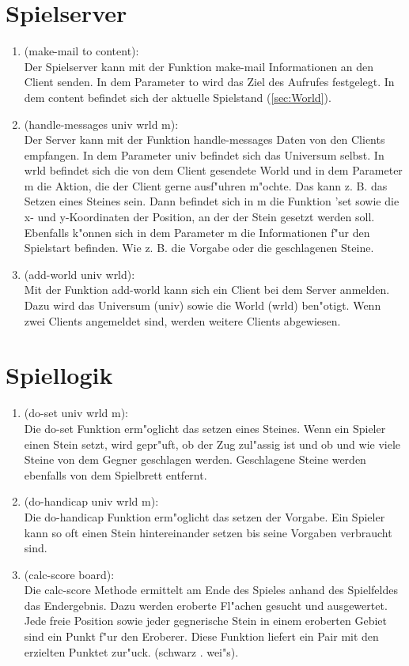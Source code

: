 \documentclass[a4paper]{scrreprt}
\begin{document}
\section{Spielserver}
\begin{enumerate}
\item (make-mail to content):\\
Der Spielserver kann mit der Funktion make-mail Informationen an den Client senden. In dem Parameter to wird das Ziel des Aufrufes festgelegt. In dem content befindet sich der aktuelle Spielstand (\ref{sec:World}).

\item (handle-messages univ wrld m):\\
Der Server kann mit der Funktion handle-messages Daten von den Clients empfangen. In dem Parameter univ befindet sich das Universum selbst. In wrld befindet sich die von dem Client gesendete World und in dem Parameter m die Aktion, die der Client gerne ausf"uhren m"ochte. Das kann z. B. das Setzen eines Steines sein. Dann befindet sich in m die Funktion 'set sowie die x- und y-Koordinaten der Position, an der der Stein gesetzt werden soll. Ebenfalls k"onnen sich in dem Parameter m die Informationen f"ur den Spielstart befinden. Wie z. B. die Vorgabe oder die geschlagenen Steine. 

\item (add-world univ wrld):\\
Mit der Funktion add-world kann sich ein Client bei dem Server anmelden. Dazu wird das Universum (univ) sowie die World (wrld) ben"otigt. Wenn zwei Clients angemeldet sind, werden weitere Clients abgewiesen.
\end{enumerate}

\section{Spiellogik}
\begin{enumerate}

\item (do-set univ wrld m):\\
Die do-set Funktion erm"oglicht das setzen eines Steines. Wenn ein Spieler einen Stein setzt, wird gepr"uft, ob der Zug zul"assig ist und ob und wie viele Steine von dem Gegner geschlagen werden. Geschlagene Steine werden ebenfalls von dem Spielbrett entfernt.

\item (do-handicap univ wrld m):\\
Die do-handicap Funktion erm"oglicht das setzen der Vorgabe. Ein Spieler kann so oft einen Stein hintereinander setzen bis seine Vorgaben verbraucht sind. 

\item (calc-score board):\\
Die calc-score Methode ermittelt am Ende des Spieles anhand des Spielfeldes das Endergebnis. Dazu werden eroberte Fl"achen gesucht und ausgewertet. Jede freie Position sowie jeder gegnerische Stein in einem eroberten Gebiet sind ein Punkt f"ur den Eroberer. Diese Funktion liefert ein Pair mit den erzielten Punktet zur"uck. (schwarz . wei"s).
\end{enumerate}
\end{document}

